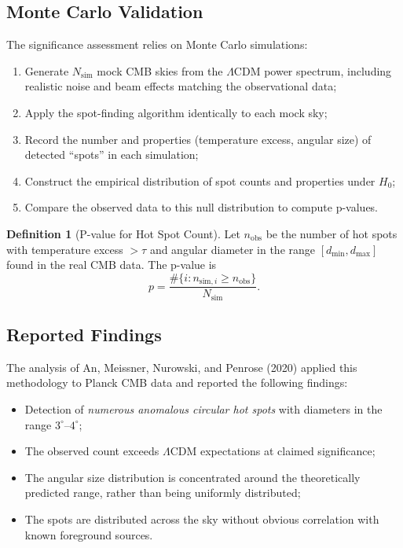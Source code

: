 \documentclass[11pt,a4paper]{article}
\theoremstyle{plain}
\theoremstyle{definition}
\newtheorem{definition}[theorem]{Definition}
\theoremstyle{remark}
\begin{document}
\subsection{Monte Carlo Validation}

The significance assessment relies on Monte Carlo simulations:

\begin{enumerate}
    \item Generate $N_{\text{sim}}$ mock CMB skies from the $\Lambda$CDM power spectrum, including realistic noise and beam effects matching the observational data;
    \item Apply the spot-finding algorithm identically to each mock sky;
    \item Record the number and properties (temperature excess, angular size) of detected ``spots'' in each simulation;
    \item Construct the empirical distribution of spot counts and properties under $H_0$;
    \item Compare the observed data to this null distribution to compute p-values.
\end{enumerate}

\begin{definition}[P-value for Hot Spot Count]\label{def:pvalue}
Let $n_{\text{obs}}$ be the number of hot spots with temperature excess $>\tau$ and angular diameter in the range $[d_{\min}, d_{\max}]$ found in the real CMB data. The p-value is
\begin{equation}\label{eq:pvalue}
    p = \frac{\#\{i : n_{\text{sim},i} \geq n_{\text{obs}}\}}{N_{\text{sim}}}.
\end{equation}
\end{definition}

\subsection{Reported Findings}

The analysis of An, Meissner, Nurowski, and Penrose (2020) applied this methodology to Planck CMB data and reported the following findings:

\begin{itemize}
    \item Detection of \emph{numerous anomalous circular hot spots} with diameters in the range $3^\circ$--$4^\circ$;
    \item The observed count exceeds $\Lambda$CDM expectations at claimed significance;
    \item The angular size distribution is concentrated around the theoretically predicted range, rather than being uniformly distributed;
    \item The spots are distributed across the sky without obvious correlation with known foreground sources.
\end{itemize}
\end{document}
